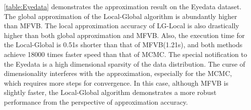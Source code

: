 \autoref{table:Eyedata} demonstrates the approximation result on the Eyedata dataset.  The global approximation of the Local-Global algorithm is abundantly higher than MFVB.  The local approximation accuracy of LG-Local is also drastically higher than both global approximation and MFVB. Also, the execution time for the Local-Global is 0.51s shorter than that of MFVB(1.21s), and both methods achieve 18000 times faster speed than that of MCMC.
The special notification to the Eyedata is a high dimensional sparsity of the data distribution. The curse of dimensionality interferes with the approximation, especially for the MCMC, which requires more steps for convergence. In this case, although MFVB is slightly faster, the Local-Global algorithm demonstrates a more robust performance from the perspective of approximation accuracy.






